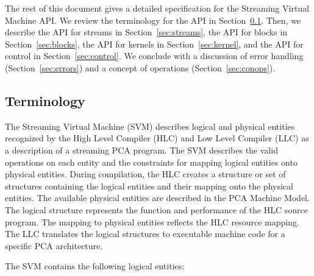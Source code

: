 The rest of this document gives a detailed specification for the
Streaming Virtual Machine API.  We review the terminology for the API
in Section~\ref{sec:terminology}.  Then, we describe the API for
streams in Section~\ref{sec:streams}, the API for blocks in
Section~\ref{sec:blocks}, the API for kernels in
Section~\ref{sec:kernel}, and the API for control in
Section~\ref{sec:control}.  We conclude with a discussion of error
handling (Section~\ref{sec:errors}) and a concept of operations
(Section~\ref{sec:conops}).

\subsection{Terminology}
\label{sec:terminology}

The Streaming Virtual Machine (SVM) describes logical and physical
entities recognized by the High Level Compiler (HLC) and Low Level
Compiler (LLC) as a description of a streaming PCA program.  The SVM
describes the valid operations on each entity and the constraints for
mapping logical entities onto physical entities.  During compilation,
the HLC creates a structure or set of structures containing the
logical entities and their mapping onto the physical entities.  The
available physical entities are described in the PCA Machine Model.
The logical structure represents the function and performance of the
HLC source program.  The mapping to physical entities reflects the HLC
resource mapping.  The LLC translates the logical structures to
executable machine code for a specific PCA architecture.

\clearpage
{}

The SVM contains the following logical entities:

